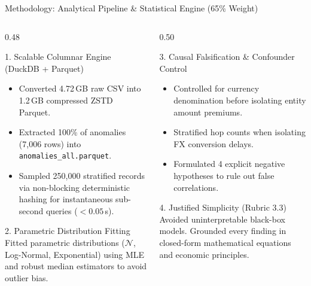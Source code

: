 \documentclass[aspectratio=169, 10pt]{beamer}
\begin{document}
\begin{frame}{Methodology: Analytical Pipeline \& Statistical Engine (65\% Weight)}
\begin{columns}[T]
  \begin{column}{0.48\textwidth}
    \begin{block}{1. Scalable Columnar Engine (DuckDB + Parquet)}
      \footnotesize
      \begin{itemize}
        \item Converted 4.72\,GB raw CSV into 1.2\,GB compressed ZSTD Parquet.
        \item Extracted 100\% of anomalies (7,006 rows) into \texttt{anomalies\_all.parquet}.
        \item Sampled 250,000 stratified records via non-blocking deterministic hashing for instantaneous sub-second queries ($<0.05$\,s).
      \end{itemize}
    \end{block}
    
    \begin{block}{2. Parametric Distribution Fitting}
      \footnotesize
      Fitted parametric distributions ($\mathcal{N}$, Log-Normal, Exponential) using MLE and robust median estimators to avoid outlier bias.
    \end{block}
  \end{column}

  \begin{column}{0.50\textwidth}
    \begin{block}{3. Causal Falsification \& Confounder Control}
      \footnotesize
      \begin{itemize}
        \item Controlled for currency denomination before isolating entity amount premiums.
        \item Stratified hop counts when isolating FX conversion delays.
        \item Formulated 4 explicit negative hypotheses to rule out false correlations.
      \end{itemize}
    \end{block}

    \begin{exampleblock}{4. Justified Simplicity (Rubric 3.3)}
      \footnotesize
      Avoided uninterpretable black-box models. Grounded every finding in closed-form mathematical equations and economic principles.
    \end{exampleblock}
  \end{column}
\end{columns}
\end{frame}
\end{document}
